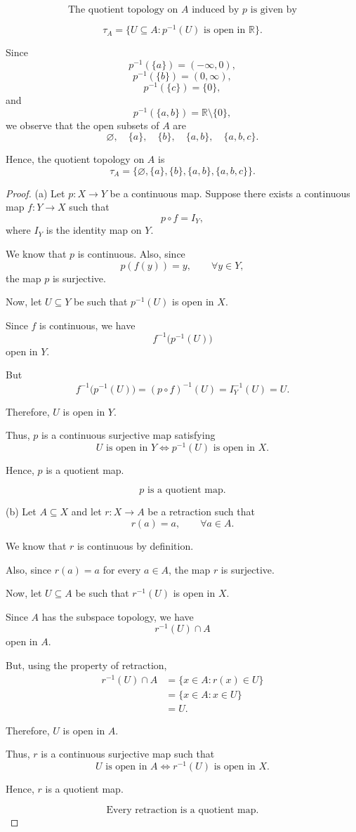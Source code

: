 \[
\text{The quotient topology on } A \text{ induced by } p
\text{ is given by}
\]

\[
\tau_A=\{U\subseteq A:p^{-1}(U)\text{ is open in }\mathbb{R}\}.
\]

Since
\[
p^{-1}(\{a\})=(-\infty,0),
\]
\[
p^{-1}(\{b\})=(0,\infty),
\]
\[
p^{-1}(\{c\})=\{0\},
\]
and
\[
p^{-1}(\{a,b\})=\mathbb{R}\setminus\{0\},
\]
we observe that the open subsets of \(A\) are
\[
\varnothing,\quad \{a\},\quad \{b\},\quad
\{a,b\},\quad \{a,b,c\}.
\]

Hence, the quotient topology on \(A\) is
\[
\boxed{
\tau_A=
\{\varnothing,\{a\},\{b\},\{a,b\},\{a,b,c\}\}.
}
\]
\]

\begin{proof}
(a) Let \(p:X\to Y\) be a continuous map. Suppose there exists a
continuous map \(f:Y\to X\) such that
\[
p\circ f=I_Y,
\]
where \(I_Y\) is the identity map on \(Y\).

We know that \(p\) is continuous. Also, since
\[
p(f(y))=y,\qquad \forall y\in Y,
\]
the map \(p\) is surjective.

Now, let \(U\subseteq Y\) be such that \(p^{-1}(U)\) is open
in \(X\).

Since \(f\) is continuous, we have
\[
f^{-1}\big(p^{-1}(U)\big)
\]
open in \(Y\).

But
\[
f^{-1}\big(p^{-1}(U)\big)
=(p\circ f)^{-1}(U)
=I_Y^{-1}(U)
=U.
\]

Therefore, \(U\) is open in \(Y\).

Thus, \(p\) is a continuous surjective map satisfying
\[
U\text{ is open in }Y
\iff p^{-1}(U)\text{ is open in }X.
\]

Hence, \(p\) is a quotient map.

\[
\boxed{p\text{ is a quotient map.}}
\]

\medskip

(b) Let \(A\subseteq X\) and let \(r:X\to A\) be a
retraction such that
\[
r(a)=a,\qquad \forall a\in A.
\]

We know that \(r\) is continuous by definition.

Also, since \(r(a)=a\) for every \(a\in A\), the map \(r\)
is surjective.

Now, let \(U\subseteq A\) be such that \(r^{-1}(U)\)
is open in \(X\).

Since \(A\) has the subspace topology, we have
\[
r^{-1}(U)\cap A
\]
open in \(A\).

But, using the property of retraction,
\[
\begin{aligned}
r^{-1}(U)\cap A
&=\{x\in A:r(x)\in U\}\\
&=\{x\in A:x\in U\}\\
&=U.
\end{aligned}
\]

Therefore, \(U\) is open in \(A\).

Thus, \(r\) is a continuous surjective map such that
\[
U\text{ is open in }A
\iff r^{-1}(U)\text{ is open in }X.
\]

Hence, \(r\) is a quotient map.

\[
\boxed{\text{Every retraction is a quotient map.}}
\]
\end{proof}

